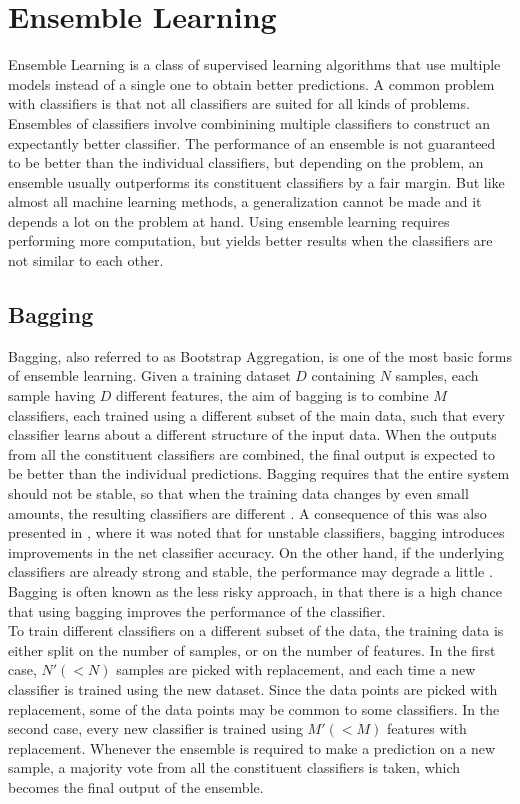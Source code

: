 \chapter{Ensemble Learning}
\label{chapter:Ensemble Learning}

Ensemble Learning is a class of supervised learning algorithms that use multiple models instead of a single one to obtain better predictions. A common problem with classifiers is that not all classifiers are suited for all kinds of problems. Ensembles of classifiers involve combinining multiple classifiers to construct an expectantly better classifier. The performance of an ensemble is not guaranteed to be better than the individual classifiers, but depending on the problem, an ensemble usually outperforms its constituent classifiers by a fair margin. But like almost all machine learning methods, a generalization cannot be made and it depends a lot on the problem at hand. Using ensemble learning requires performing more computation, but yields better results when the classifiers are not similar to each other.

\section{Bagging}
Bagging, also referred to as Bootstrap Aggregation, is one of the most basic forms of ensemble learning. Given a training dataset $D$ containing $N$ samples, each sample having $D$ different features, the aim of bagging is to combine $M$ classifiers, each trained using a different subset of the main data, such that every classifier learns about a different structure of the input data. When the outputs from all the constituent classifiers are combined, the final output is expected to be better than the individual predictions. Bagging requires that the entire system should not be stable, so that when the training data changes by even small amounts, the resulting classifiers are different \cite{quinlan1996bagging}. A consequence of this was also presented in \cite{breiman1994bagging}, where it was noted that for unstable classifiers, bagging introduces improvements in the net classifier accuracy. On the other hand, if the underlying classifiers are already strong and stable, the performance may degrade a little \cite{breiman1996bagging}. Bagging is often known as the less risky approach, in that there is a high chance that using bagging improves the performance of the classifier.\\

To train different classifiers on a different subset of the data, the training data is either split on the number of samples, or on the number of features. In the first case, $N' (< N)$ samples are picked with replacement, and each time a new classifier is trained using the new dataset. Since the data points are picked with replacement, some of the data points may be common to some classifiers. In the second case, every new classifier is trained using $M' (< M)$ features with replacement. Whenever the ensemble is required to make a prediction on a new sample, a majority vote from all the constituent classifiers is taken, which becomes the final output of the ensemble.

